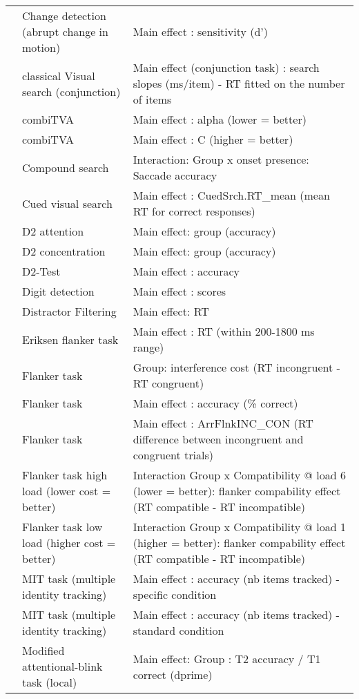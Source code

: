 \documentclass[
]{book}
\begin{document}
\begin{tabular}{l|l|l}
\cline{2-3}
 & Change detection (abrupt change in motion) & Main effect : sensitivity (d')\\
\cline{2-3}
 & classical Visual search (conjunction) & Main effect (conjunction task) : search slopes (ms/item) - RT fitted on the number of items\\
\cline{2-3}
 & combiTVA & Main effect : alpha (lower = better)\\
\cline{2-3}
 & combiTVA & Main effect : C (higher = better)\\
\cline{2-3}
 & Compound search & Interaction: Group x onset presence: Saccade accuracy\\
\cline{2-3}
 & Cued visual search & Main effect : CuedSrch.RT\_mean (mean RT for correct responses)\\
\cline{2-3}
 & D2 attention & Main effect: group (accuracy)\\
\cline{2-3}
 & D2 concentration & Main effect: group (accuracy)\\
\cline{2-3}
 & D2-Test & Main effect : accuracy\\
\cline{2-3}
 & Digit detection & Main effect : scores\\
\cline{2-3}
 & Distractor Filtering & Main effect: RT\\
\cline{2-3}
 & Eriksen flanker task & Main effect : RT (within 200-1800 ms range)\\
\cline{2-3}
 & Flanker task & Group: interference cost (RT incongruent - RT congruent)\\
\cline{2-3}
 & Flanker task & Main effect : accuracy (\% correct)\\
\cline{2-3}
 & Flanker task & Main effect : ArrFlnkINC\_CON (RT difference between incongruent and congruent trials)\\
\cline{2-3}
 & Flanker task high load (lower cost = better) & Interaction Group x Compatibility @ load 6 (lower = better): flanker compability effect (RT compatible - RT incompatible)\\
\cline{2-3}
 & Flanker task low load (higher cost = better) & Interaction Group x Compatibility @ load 1 (higher = better): flanker compability effect (RT compatible - RT incompatible)\\
\cline{2-3}
 & MIT task (multiple identity tracking) & Main effect : accuracy (nb items tracked) - specific condition\\
\cline{2-3}
 & MIT task (multiple identity tracking) & Main effect : accuracy (nb items tracked) - standard condition\\
\cline{2-3}
 & Modified attentional-blink task (local) & Main effect: Group : T2 accuracy / T1 correct (dprime)\\

\end{tabular}
\end{document}
